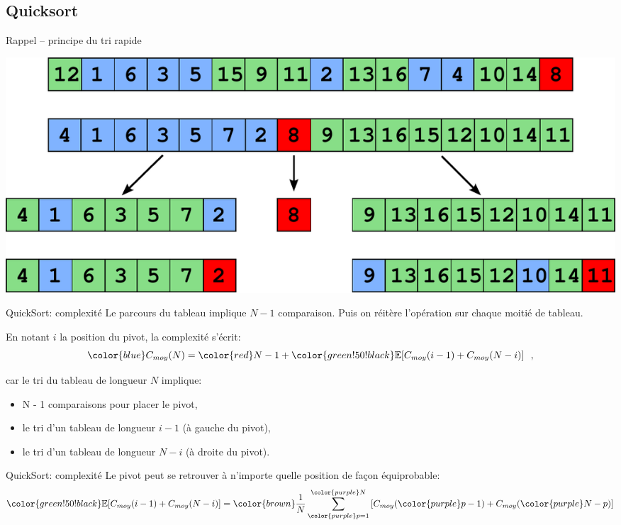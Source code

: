 \subsection{Quicksort}

\begin{frame}{Rappel -- principe du tri rapide}
\begin{center}
\includegraphics[width=\linewidth]{images/quicksort.pdf}
\end{center}
\end{frame}

\begin{frame}{QuickSort: complexité}
 Le parcours du tableau implique $N-1$ comparaison. Puis on réitère l'opération sur chaque moitié de tableau.
 
 En notant $i$ la position du pivot, la complexité s'écrit:
 $$ {\color{blue} C_{moy}(N)} = {\color{red} N - 1} + {\color{green!50!black} \mathbb{E}[C_{moy}(i-1) + C_{moy}(N-i)]}~~,$$
 
 car le tri du tableau de longueur $N$ implique:
 \begin{itemize}
  \item {\color{red} N - 1 comparaisons pour placer le pivot},
  \item {\color{green!50!black} le tri d'un tableau de longueur $i - 1$ (à gauche du pivot)},
  \item {\color{green!50!black} le tri d'un tableau de longueur $N - i$ (à droite du pivot)}.
 \end{itemize}
\end{frame}

\begin{frame}{QuickSort: complexité}
 Le pivot peut se retrouver à {\color{purple}n'importe quelle position} de {\color{brown}façon équiprobable}:
$$\color{green!50!black} \mathbb{E}[C_{moy}(i-1) + C_{moy}(N-i)] = {\color{brown} \frac{1}{N} \sum_{{\color{purple} p=1}}^{{\color{purple} N}}}  \left[ C_{moy}({\color{purple} p-1}) + C_{moy}({\color{purple} N-p})\right]$$

\end{frame}


